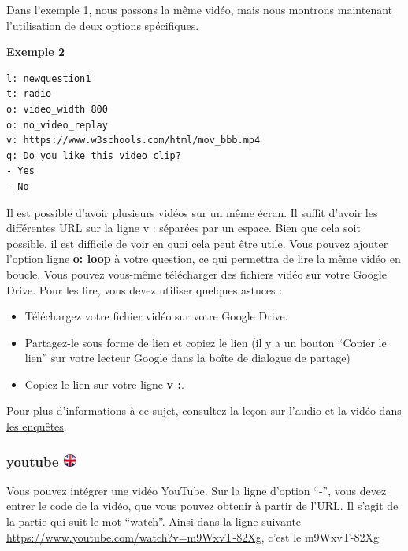 \documentclass[
]{book}
\providecommand{\tightlist}{%
  \setlength{\itemsep}{0pt}\setlength{\parskip}{0pt}}
\begin{document}
Dans l'exemple 1, nous passons la même vidéo, mais nous montrons
maintenant l'utilisation de deux options spécifiques.

\textbf{Exemple 2}

\begin{verbatim}
l: newquestion1
t: radio
o: video_width 800
o: no_video_replay
v: https://www.w3schools.com/html/mov_bbb.mp4
q: Do you like this video clip?
- Yes
- No
\end{verbatim}

Il est possible d'avoir plusieurs vidéos sur un même écran. Il suffit
d'avoir les différentes URL sur la ligne v : séparées par un espace.
Bien que cela soit possible, il est difficile de voir en quoi cela peut
être utile. Vous pouvez ajouter l'option ligne \textbf{o: loop} à votre
question, ce qui permettra de lire la même vidéo en boucle. Vous pouvez
vous-même télécharger des fichiers vidéo sur votre Google Drive. Pour
les lire, vous devez utiliser quelques astuces :

\begin{itemize}
\tightlist
\item
  Téléchargez votre fichier vidéo sur votre Google Drive.
\item
  Partagez-le sous forme de lien et copiez le lien (il y a un bouton
  ``Copier le lien'' sur votre lecteur Google dans la boîte de dialogue
  de partage)
\item
  Copiez le lien sur votre ligne \textbf{v :}.
\end{itemize}

Pour plus d'informations à ce sujet, consultez la leçon sur
\protect\hyperlink{s10}{l'audio et la vidéo dans les enquêtes}.

\hypertarget{youtube}{%
\subsubsection[youtube ]{\texorpdfstring{youtube
\href{https://www.psytoolkit.org/doc3.1.0/online-survey-syntax.html\#youtube}{\protect\includegraphics{img/ukflag.png}}}{youtube }}\label{youtube}}

Vous pouvez intégrer une vidéo YouTube. Sur la ligne d'option ``-'',
vous devez entrer le code de la vidéo, que vous pouvez obtenir à partir
de l'URL. Il s'agit de la partie qui suit le mot ``watch''. Ainsi dans
la ligne suivante \url{https://www.youtube.com/watch?v=m9WxvT-82Xg},
c'est le m9WxvT-82Xg
\end{document}
